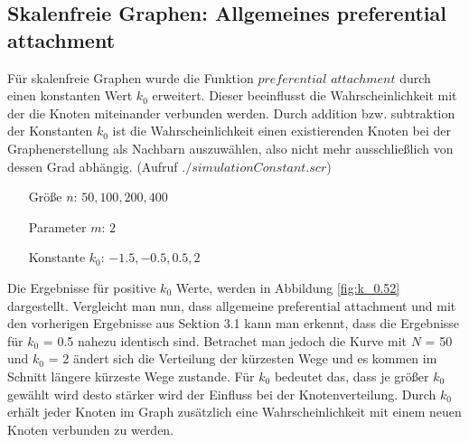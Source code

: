 \documentclass[10pt]{article}
\begin{document}
\subsection{Skalenfreie Graphen: Allgemeines preferential attachment}
Für skalenfreie Graphen wurde die Funktion $preferential$ $attachment$ durch einen konstanten Wert $k_0$ erweitert. Dieser beeinflusst die Wahrscheinlichkeit mit der die Knoten miteinander verbunden werden. Durch addition bzw. subtraktion der Konstanten $k_0$ ist die Wahrscheinlichkeit einen existierenden Knoten bei der Graphenerstellung als Nachbarn auszuwählen, also nicht mehr ausschließlich von dessen Grad abhängig. (Aufruf $./simulationConstant.scr$) 

\begin{itemize}
\item[\quad Größe $n$:] $50,100,200,400$
\item[\quad Parameter $m$:] $2$
\item[\quad Konstante $k_0$:] $-1.5,-0.5,0.5,2$
\end{itemize}

Die Ergebnisse für positive $k_0$ Werte, werden in Abbildung \ref{fig:k_0.52} dargestellt. Vergleicht man nun, dass allgemeine preferential attachment und mit den vorherigen Ergebnisse aus Sektion 3.1 kann man erkennt, dass die Ergebnisse für $k_0$ = 0.5 nahezu identisch sind. Betrachet man jedoch die Kurve mit $N$ = 50 und $k_0$ = 2 ändert sich die Verteilung der kürzesten Wege und es kommen im Schnitt längere kürzeste Wege zustande. Für $k_0$ bedeutet das, dass je größer $k_0$ gewählt wird desto stärker wird der Einfluss bei der Knotenverteilung. Durch $k_0$ erhält jeder Knoten im Graph zusätzlich eine Wahrscheinlichkeit mit einem neuen Knoten verbunden zu werden.
\end{document}
